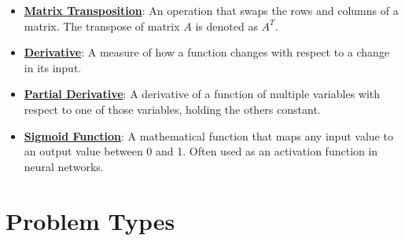 \documentclass{article}%
\begin{document}
\begin{itemize}[leftmargin=*]
\item \href{\url{https://purdue.brightspace.com/d2l/common/assets/pdfjs-d2l-dist/1.0.14-legacy/web/viewer.html?file=\%252Fcontent\%252Fenforced\%252F1095467-wl.202510.CS.24300.001\%252F04L1-Linear\%20Algebra\%20Primer.pdf\%253Fou\%253D1095467\&lang=en-us\&container=d2l-fileviewer-rendered-pdf\&fullscreen=d2l-fileviewer-rendered-pdf-dialog\&height=667}#page=16}{\textbf{Matrix Transposition}}: An operation that swaps the rows and columns of a matrix. The transpose of matrix $A$ is denoted as $A^T$.%
\item \href{\url{https://purdue.brightspace.com/d2l/common/assets/pdfjs-d2l-dist/1.0.14-legacy/web/viewer.html?file=\%252Fcontent\%252Fenforced\%252F1095467-wl.202510.CS.24300.001\%252F04L1-Linear\%20Algebra\%20Primer.pdf\%253Fou\%253D1095467\&lang=en-us\&container=d2l-fileviewer-rendered-pdf\&fullscreen=d2l-fileviewer-rendered-pdf-dialog\&height=667}#page=21}{\textbf{Derivative}}: A measure of how a function changes with respect to a change in its input.%
\item \href{\url{https://purdue.brightspace.com/d2l/common/assets/pdfjs-d2l-dist/1.0.14-legacy/web/viewer.html?file=\%252Fcontent\%252Fenforced\%252F1095467-wl.202510.CS.24300.001\%252F04L1-Linear\%20Algebra\%20Primer.pdf\%253Fou\%253D1095467\&lang=en-us\&container=d2l-fileviewer-rendered-pdf\&fullscreen=d2l-fileviewer-rendered-pdf-dialog\&height=667}#page=19}{\textbf{Partial Derivative}}: A derivative of a function of multiple variables with respect to one of those variables, holding the others constant.%
\item \href{\url{https://purdue.brightspace.com/d2l/common/assets/pdfjs-d2l-dist/1.0.14-legacy/web/viewer.html?file=\%252Fcontent\%252Fenforced\%252F1095467-wl.202510.CS.24300.001\%252F04L1-Linear\%20Algebra\%20Primer.pdf\%253Fou\%253D1095467\&lang=en-us\&container=d2l-fileviewer-rendered-pdf\&fullscreen=d2l-fileviewer-rendered-pdf-dialog\&height=667}#page=21}{\textbf{Sigmoid Function}}: A mathematical function that maps any input value to an output value between 0 and 1. Often used as an activation function in neural networks.%
\end{itemize}

%
\section{Problem Types}%
\label{sec:ProblemTypes}%
\end{document}
